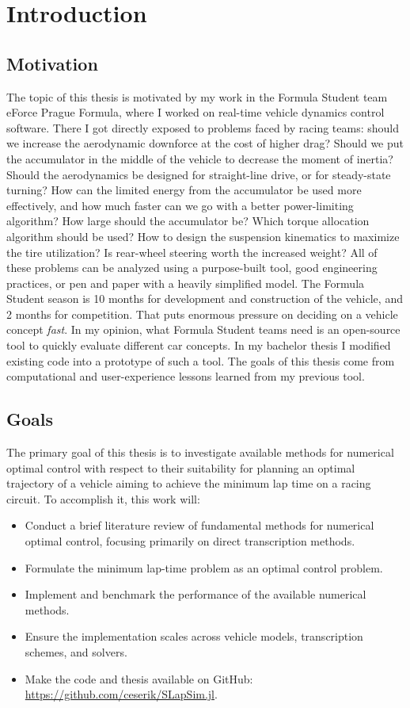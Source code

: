 \chapter{Introduction}
\section{Motivation}
The topic of this thesis is motivated by my work in the Formula Student team eForce
Prague Formula, where I worked on real-time vehicle dynamics control software.
There I got directly exposed to problems faced by racing teams: should we increase the aerodynamic downforce at the cost of higher drag? Should
we put the accumulator in the middle of the vehicle to decrease the moment of inertia?
Should the aerodynamics be designed for straight-line drive, or for steady-state turning? How can the limited energy from the accumulator be used more effectively, and
how much faster can we go with a better power-limiting algorithm? How large should the
accumulator be? Which torque allocation algorithm should be used? How to
design the suspension kinematics to maximize the tire utilization? Is rear-wheel steering worth the increased weight? All of these problems can be
analyzed using a purpose-built tool, good engineering practices, or pen
and paper with a heavily simplified model. The Formula Student season is 10 months
for development and construction of the vehicle, and 2 months for competition. That
puts enormous pressure on deciding on a vehicle concept \emph{fast}. In my opinion, what
Formula Student teams need is an open-source tool to quickly evaluate different car
concepts. In my bachelor thesis I modified existing code into a prototype of such a tool. The goals of
this thesis come from computational and user-experience lessons learned from my previous tool.

\section{Goals}
The primary goal of this thesis is to investigate available methods for numerical optimal control with respect to their suitability for planning an optimal trajectory of a vehicle aiming to achieve the minimum lap time on a racing circuit. To accomplish it, this work will:
\begin{itemize}
    \item Conduct a brief literature review of fundamental methods for numerical optimal control, focusing primarily on direct transcription methods.
    \item Formulate the minimum lap-time problem as an optimal control problem.
    
    \item Implement and benchmark the performance of the available numerical methods.
    \item Ensure the implementation scales across vehicle models, transcription
schemes, and solvers.
    \item Make the code and thesis available on GitHub: \url{https://github.com/ceserik/SLapSim.jl}.
\end{itemize}

